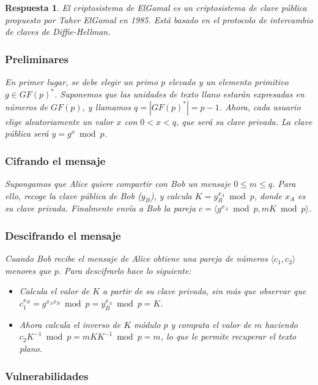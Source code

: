 \documentclass[
  a4paper,
  spanish,
  12pt,
]{scrartcl}
\theoremstyle{ejercicio-style}
\theoremstyle{remark-style}
\newtheorem*{sol}{Respuesta}
\theoremstyle{teorema-style}
\begin{document}
\begin{sol}
El criptosistema de ElGamal es un criptosistema de clave pública propuesto por Taher ElGamal en 1985. Está basado en el protocolo de intercambio de claves de Diffie-Hellman.

\subsubsection*{Preliminares}

En primer lugar, se debe elegir un primo $p$ elevado y un elemento primitivo $g \in GF(p)^\ast$. Suponemos que las unidades de texto llano estarán expresadas en números de $GF(p)$, y llamamos $q = |GF(p)^\ast| = p -1$. Ahora, cada usuario elige aleatoriamente un valor $x$ con $0 < x < q$, que será su clave privada. La clave pública será $y = g^x \bmod p$.

\subsubsection*{Cifrando el mensaje}

Supongamos que Alice quiere compartir con Bob un mensaje \(0\leq m \leq q\). Para ello, recoge la clave pública de Bob ($y_B$), y calcula $K = y_B ^{x_A} \bmod p$, donde $x_A$ es su clave privada. Finalmente envía a Bob la pareja \(c = \langle g^{x_{A}} \bmod{p}, mK \bmod p\rangle\).

\subsubsection*{Descifrando el mensaje}

Cuando Bob recibe el mensaje de Alice obtiene una pareja de números $\langle c_1, c_2 \rangle$ menores que $p$. Para descifrarlo hace lo siguiente:

\begin{itemize}
  \item Calcula el valor de $K$ a partir de su clave privada, sin más que observar que $c_1^{x_B} = g^{x_Ax_B} \bmod p = y_B^{x_A} \bmod p = K$.
  \item Ahora calcula el inverso de $K$ módulo $p$ y computa el valor de $m$ haciendo $c_2K^{-1} \bmod p = mKK^{-1} \bmod p = m$, lo que le permite recuperar el texto plano.
\end{itemize}

\subsubsection*{Vulnerabilidades}


\end{sol}
\end{document}
